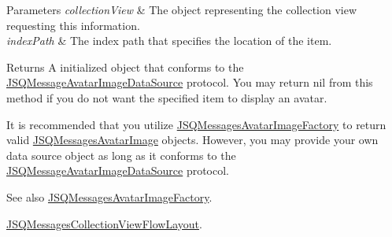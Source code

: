 \begin{DoxyParams}{Parameters}
{\em collection\+View} & The object representing the collection view requesting this information. \\
\hline
{\em index\+Path} & The index path that specifies the location of the item.\\
\hline
\end{DoxyParams}
\begin{DoxyReturn}{Returns}
A initialized object that conforms to the {\ttfamily \hyperlink{protocol_j_s_q_message_avatar_image_data_source-p}{J\+S\+Q\+Message\+Avatar\+Image\+Data\+Source}} protocol. You may return {\ttfamily nil} from this method if you do not want the specified item to display an avatar.
\end{DoxyReturn}
It is recommended that you utilize {\ttfamily \hyperlink{interface_j_s_q_messages_avatar_image_factory}{J\+S\+Q\+Messages\+Avatar\+Image\+Factory}} to return valid {\ttfamily \hyperlink{interface_j_s_q_messages_avatar_image}{J\+S\+Q\+Messages\+Avatar\+Image}} objects. However, you may provide your own data source object as long as it conforms to the {\ttfamily \hyperlink{protocol_j_s_q_message_avatar_image_data_source-p}{J\+S\+Q\+Message\+Avatar\+Image\+Data\+Source}} protocol.

\begin{DoxySeeAlso}{See also}
\hyperlink{interface_j_s_q_messages_avatar_image_factory}{J\+S\+Q\+Messages\+Avatar\+Image\+Factory}. 

\hyperlink{interface_j_s_q_messages_collection_view_flow_layout}{J\+S\+Q\+Messages\+Collection\+View\+Flow\+Layout}. 
\end{DoxySeeAlso}
\hypertarget{protocol_j_s_q_messages_collection_view_data_source-p_a9c42dbd1b26d48cc2e4df29de57e5846}{}
